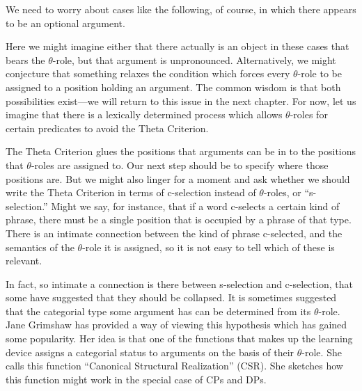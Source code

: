 We need to worry about cases like the following, of course, in which there appears to be an optional argument.
\begin{exe}
	\ex \label{ex2:51} 
	\begin{xlist}
	\end{xlist}
\end{exe}
Here we might imagine either that there actually is an object in these cases that bears the \mbox{$\theta$-role}, but that argument is unpronounced. Alternatively, we might conjecture that something relaxes the condition which forces every \mbox{$\theta$-role} to be assigned to a position holding an argument. The common wisdom is that both possibilities exist---we will return to this issue in the next chapter. For now, let us imagine that there is a lexically determined process which allows \mbox{$\theta$-roles} for certain predicates to avoid the Theta Criterion.

The Theta Criterion glues the positions that arguments can be in to the positions that \mbox{$\theta$-roles} are assigned to. Our next step should be to specify where those positions are. But we might also linger for a moment and ask whether we should write the Theta Criterion in terms of \mbox{c-selection} instead of \mbox{$\theta$-roles}, or ``\mbox{s-selection}.'' Might we say, for instance, that if a word \mbox{c-selects} a certain kind of phrase, there must be a single position that is occupied by a phrase of that type. There is an intimate connection between the kind of phrase \mbox{c-selected}, and the semantics of the \mbox{$\theta$-role} it is assigned, so it is not easy to tell which of these is relevant.

In fact, so intimate a connection is there between \mbox{s-selection} and \mbox{c-selection}, that some have suggested that they should be collapsed. It is sometimes suggested that the categorial type some argument has can be determined from its \mbox{$\theta$-role}. Jane Grimshaw\cite{Grimshaw:1979} has provided a way of viewing this hypothesis which has gained some popularity. Her idea is that one of the functions that makes up the learning device assigns a categorial status to arguments on the basis of their \mbox{$\theta$-role}. She calls this function ``Canonical Structural Realization'' (CSR). She sketches how this function might work in the special case of CPs and DPs.

